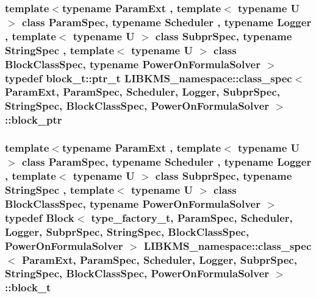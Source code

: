 \hypertarget{structLIBKMS__namespace_1_1class__spec_acbfd7c07aa4238536acc8d1ee3bca661}{
\subsubsection[{block\-\_\-ptr}]{\setlength{\rightskip}{0pt plus 5cm}template$<$typename Param\-Ext , template$<$ typename U $>$ class Param\-Spec, typename Scheduler , typename Logger , template$<$ typename U $>$ class Subpr\-Spec, typename String\-Spec , template$<$ typename U $>$ class Block\-Class\-Spec, typename Power\-On\-Formula\-Solver $>$ typedef {\bf block\-\_\-t\-::ptr\-\_\-t} {\bf L\-I\-B\-K\-M\-S\-\_\-namespace\-::class\-\_\-spec}$<$ Param\-Ext, Param\-Spec, Scheduler, Logger, Subpr\-Spec, String\-Spec, Block\-Class\-Spec, Power\-On\-Formula\-Solver $>$\-::{\bf block\-\_\-ptr}}}\label{structLIBKMS__namespace_1_1class__spec_acbfd7c07aa4238536acc8d1ee3bca661}
\hypertarget{structLIBKMS__namespace_1_1class__spec_a92d07492e14366ebea16a661abd33180}{
\subsubsection[{block\-\_\-t}]{\setlength{\rightskip}{0pt plus 5cm}template$<$typename Param\-Ext , template$<$ typename U $>$ class Param\-Spec, typename Scheduler , typename Logger , template$<$ typename U $>$ class Subpr\-Spec, typename String\-Spec , template$<$ typename U $>$ class Block\-Class\-Spec, typename Power\-On\-Formula\-Solver $>$ typedef {\bf Block}$<$ {\bf type\-\_\-factory\-\_\-t}, Param\-Spec, Scheduler, Logger, Subpr\-Spec, String\-Spec, Block\-Class\-Spec, Power\-On\-Formula\-Solver $>$ {\bf L\-I\-B\-K\-M\-S\-\_\-namespace\-::class\-\_\-spec}$<$ Param\-Ext, Param\-Spec, Scheduler, Logger, Subpr\-Spec, String\-Spec, Block\-Class\-Spec, Power\-On\-Formula\-Solver $>$\-::{\bf block\-\_\-t}}}\label{structLIBKMS__namespace_1_1class__spec_a92d07492e14366ebea16a661abd33180}
